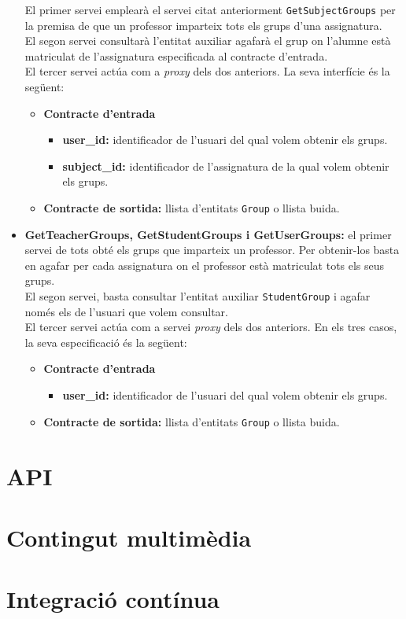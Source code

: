 \begin{itemize}
			El primer servei emplearà el servei citat anteriorment \texttt{GetSubjectGroups} per la premisa de que un professor imparteix tots els grups d'una assignatura.\\
			
			El segon servei consultarà l'entitat auxiliar agafarà el grup on l'alumne està matriculat de l'assignatura especificada al contracte d'entrada.\\
			
			El tercer servei actúa com a \emph{proxy} dels dos anteriors. La seva interfície és la següent:
				\begin{itemize}
					\item \textbf{Contracte d'entrada}
						\begin{itemize}
							\item \textbf{user\_id:} identificador de l'usuari del qual volem obtenir els grups.
							\item \textbf{subject\_id:} identificador de l'assignatura de la qual volem obtenir els grups.
						\end{itemize}
					\item \textbf{Contracte de sortida:} llista d'entitats \texttt{Group} o llista buida.
				\end{itemize}
			
			\item \textbf{GetTeacherGroups, GetStudentGroups i GetUserGroups:} el primer servei de tots obté els grups que imparteix un professor. Per obtenir-los basta en agafar per cada assignatura on el professor està matriculat tots els seus grups.\\
			
			El segon servei, basta consultar l'entitat auxiliar \texttt{StudentGroup} i agafar només els de l'usuari que volem consultar.\\
			
			El tercer servei actúa com a servei \emph{proxy} dels dos anteriors. En els tres casos, la seva especificació és la següent:
		
			\begin{itemize}
					\item \textbf{Contracte d'entrada}
						\begin{itemize}
							\item \textbf{user\_id:} identificador de l'usuari del qual volem obtenir els grups.
						\end{itemize}
					\item \textbf{Contracte de sortida:} llista d'entitats \texttt{Group} o llista buida.
				\end{itemize}
				
		\end{itemize}
\section{\ac{API}} \label{sec_api2}

\section{Contingut multimèdia} \label{contingut_multimedia}
	
\section{Integració contínua}



